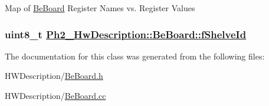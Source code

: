 Map of \hyperlink{class_ph2___hw_description_1_1_be_board}{Be\-Board} Register Names vs. Register Values \hypertarget{class_ph2___hw_description_1_1_be_board_8e45d863c0a596466a78fd3e16ef92d1}{
\subsubsection[fShelveId]{\setlength{\rightskip}{0pt plus 5cm}uint8\_\-t \hyperlink{class_ph2___hw_description_1_1_be_board_8e45d863c0a596466a78fd3e16ef92d1}{Ph2\_\-Hw\-Description::Be\-Board::f\-Shelve\-Id}}}
\label{class_ph2___hw_description_1_1_be_board_8e45d863c0a596466a78fd3e16ef92d1}




The documentation for this class was generated from the following files:\begin{CompactItemize}
\item 
HWDescription/\hyperlink{_be_board_8h}{Be\-Board.h}\item 
HWDescription/\hyperlink{_be_board_8cc}{Be\-Board.cc}\end{CompactItemize}
